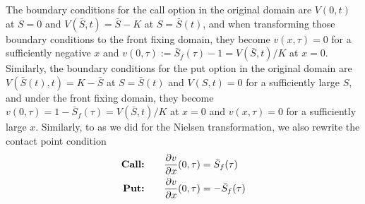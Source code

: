 The boundary conditions for the call option in the original domain are
$V(0,t)$ at $S=0$ and $V(\bar{S}, t) = \bar{S} - K$  at $S=\bar{S}(t)$, and when transforming those boundary conditions to the front fixing domain, they become $v(x, \tau) = 0$ for a sufficiently negative $x$ and $v(0, \tau) := \bar{S}_f(\tau) - 1 = V(\bar{S}, t) / K$ at $x=0$. Similarly, the boundary conditions for the put option in the original domain are $V(\bar{S}(t), t) = K - \bar{S}$ at $S=\bar{S}(t)$ and $V(S, t) = 0$ for a sufficiently large $S$, and under the front fixing domain, they become $v(0, \tau) = 1 - \bar{S}_f(\tau) = V(\bar{S}, t) / K$ at $x=0$ and $v(x, \tau) = 0$ for a sufficiently large $x$. Similarly, to as we did for the Nielsen transformation, we also rewrite the contact point condition
\begin{subequations}
  \begin{align}
    \text{\textbf{Call:}} \qquad & \dfrac{\partial v}{\partial x}(0, \tau) =  \bar{S}_f(\tau)\\
    \text{\textbf{Put:}} \qquad & \dfrac{\partial v}{\partial x}(0, \tau) = -\bar{S}_f(\tau)
  \end{align}
\end{subequations}
